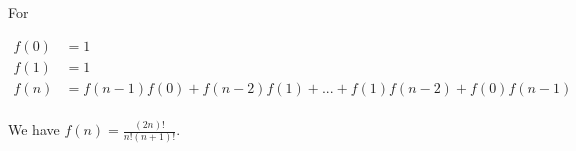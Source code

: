 
For

\begin{align*}
	f(0)&=1\\
	f(1)&=1\\
	f(n)&=f(n-1)f(0)+f(n-2)f(1)+...+f(1)f(n-2)+f(0)f(n-1)\\
\end{align*}

We have $f(n)=\frac{(2n)!}{n!(n+1)!}$.

